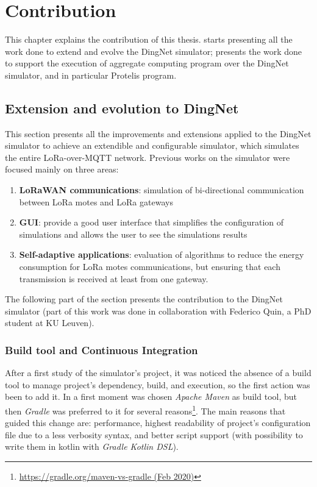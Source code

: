 \chapter{Contribution}
\label{chap:contribution}
This chapter explains the contribution of this thesis.  starts presenting all the work done to extend and evolve the DingNet simulator;  presents  the work done to support the execution of aggregate computing program over the DingNet simulator, and in particular Protelis program. 

\section{Extension and evolution to DingNet}
\label{sec:contributionDingNet}
This section presents all the improvements and extensions applied to the DingNet simulator to achieve an extendible and configurable simulator, which simulates the entire LoRa-over-MQTT network. 
Previous works on the simulator were focused mainly on three areas:
\begin{enumerate}
    \item \textbf{LoRaWAN communications}: simulation of bi-directional communication between LoRa motes and LoRa gateways
    \item \textbf{GUI}: provide a good user interface that simplifies the configuration of simulations and allows the user to see the simulations results
    \item \textbf{Self-adaptive applications}: evaluation of algorithms to reduce the energy consumption for LoRa motes communications, but ensuring that each transmission is received at least from one gateway.
\end{enumerate}
The following part of the section presents the contribution to the DingNet simulator (part of this work was done in collaboration with Federico Quin, a PhD student at KU Leuven).
\clearpage
\subsection{Build tool and Continuous Integration}
After a first study of the simulator's project, it was noticed the absence of a build tool to manage project's dependency, build, and execution, so the first action was been to add it. 
In a first moment was chosen \textit{Apache Maven} as build tool, but then \textit{Gradle} was preferred to it for several reasons\footnote{ \href{https://gradle.org/maven-vs-gradle/}{https://gradle.org/maven-vs-gradle (Feb 2020)}}. The main reasons that guided this change are: performance, highest readability of project's configuration file due to a less verbosity syntax, and better script support (with possibility to write them in kotlin with \textit{Gradle Kotlin DSL}). 

